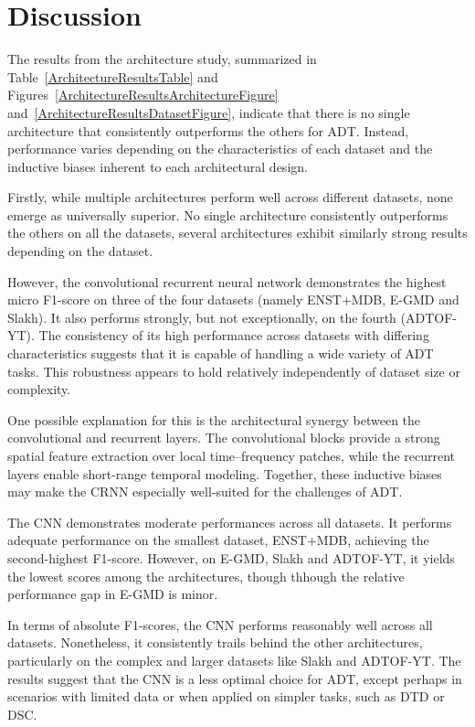 \section{Discussion}

The results from the architecture study, summarized in Table~\ref{ArchitectureResultsTable} and Figures~\ref{ArchitectureResultsArchitectureFigure} and~\ref{ArchitectureResultsDatasetFigure}, indicate that there is no single architecture that consistently outperforms the others for \gls{ADT}. Instead, performance varies depending on the characteristics of each dataset and the inductive biases inherent to each architectural design.

Firstly, while multiple architectures perform well across different datasets, none emerge as universally superior. No single architecture consistently outperforms the others on all the datasets, several architectures exhibit similarly strong results depending on the dataset. 

However, the convolutional recurrent neural network demonstrates the highest micro F1-score on three of the four datasets (namely ENST+MDB, E-GMD and Slakh). It also performs strongly, but not exceptionally, on the fourth (ADTOF-YT). The consistency of its high performance across datasets with differing characteristics suggests that it is capable of handling a wide variety of \gls{ADT} tasks. This robustness appears to hold relatively independently of dataset size or complexity. 

One possible explanation for this is the architectural synergy between the convolutional and recurrent layers. The convolutional blocks provide a strong spatial feature extraction over local time–frequency patches, while the recurrent layers enable short-range temporal modeling. Together, these inductive biases may make the \gls{CRNN} especially well-suited for the challenges of \gls{ADT}.

The \acrfull{CNN} demonstrates moderate performances across all datasets. It performs adequate performance on the smallest dataset, ENST+MDB, achieving the second-highest F1-score. However, on E-GMD, Slakh and ADTOF-YT, it yields the lowest scores among the architectures, though thhough the relative performance gap in E-GMD is minor. 

In terms of absolute F1-scores, the \gls{CNN} performs reasonably well across all datasets. Nonetheless, it consistently trails behind the other architectures, particularly on the complex and larger datasets like Slakh and ADTOF-YT. The results suggest that the \gls{CNN} is a less optimal choice for \gls{ADT}, except perhaps in scenarios with limited data or when applied on simpler tasks, such as \gls{DTD} or \acrfull{DSC}. 


